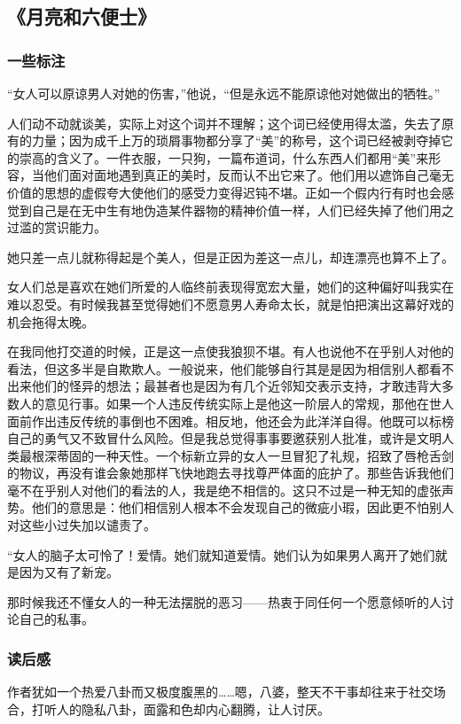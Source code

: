 \subsection{《月亮和六便士》}
\subsubsection{一些标注}
“女人可以原谅男人对她的伤害，”他说，“但是永远不能原谅他对她做出的牺牲。”

人们动不动就谈美，实际上对这个词并不理解；这个词已经使用得太滥，失去了原有的力量；因为成千上万的琐屑事物都分享了“美”的称号，这个词已经被剥夺掉它的崇高的含义了。一件衣服，一只狗，一篇布道词，什么东西人们都用“美”来形容，当他们面对面地遇到真正的美时，反而认不出它来了。他们用以遮饰自己毫无价值的思想的虚假夸大使他们的感受力变得迟钝不堪。正如一个假内行有时也会感觉到自己是在无中生有地伪造某件器物的精神价值一样，人们已经失掉了他们用之过滥的赏识能力。

她只差一点儿就称得起是个美人，但是正因为差这一点儿，却连漂亮也算不上了。

女人们总是喜欢在她们所爱的人临终前表现得宽宏大量，她们的这种偏好叫我实在难以忍受。有时候我甚至觉得她们不愿意男人寿命太长，就是怕把演出这幕好戏的机会拖得太晚。

在我同他打交道的时候，正是这一点使我狼狈不堪。有人也说他不在乎别人对他的看法，但这多半是自欺欺人。一般说来，他们能够自行其是是因为相信别人都看不出来他们的怪异的想法；最甚者也是因为有几个近邻知交表示支持，才敢违背大多数人的意见行事。如果一个人违反传统实际上是他这一阶层人的常规，那他在世人面前作出违反传统的事倒也不困难。相反地，他还会为此洋洋自得。他既可以标榜自己的勇气又不致冒什么风险。但是我总觉得事事要邀获别人批准，或许是文明人类最根深蒂固的一种天性。一个标新立异的女人一旦冒犯了礼规，招致了唇枪舌剑的物议，再没有谁会象她那样飞快地跑去寻找尊严体面的庇护了。那些告诉我他们毫不在乎别人对他们的看法的人，我是绝不相信的。这只不过是一种无知的虚张声势。他们的意思是：他们相信别人根本不会发现自己的微疵小瑕，因此更不怕别人对这些小过失加以谴责了。

“女人的脑子太可怜了！爱情。她们就知道爱情。她们认为如果男人离开了她们就是因为又有了新宠。

那时候我还不懂女人的一种无法摆脱的恶习——热衷于同任何一个愿意倾听的人讨论自己的私事。
\subsubsection{读后感}
作者犹如一个热爱八卦而又极度腹黑的……嗯，八婆，整天不干事却往来于社交场合，打听人的隐私八卦，面露和色却内心翻腾，让人讨厌。